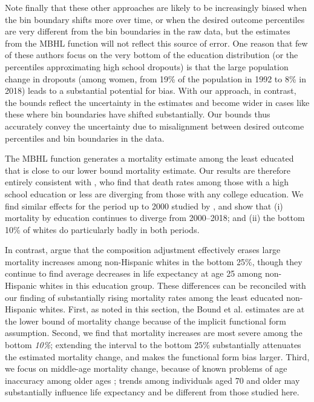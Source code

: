 Note finally that these other approaches are likely to be increasingly biased when the bin boundary shifts more over time, or when the desired outcome percentiles are very different from the bin boundaries in the raw data, but the estimates from the MBHL function will not reflect this source of error. One reason that few of these authors focus on the very bottom of the education distribution (or the percentiles approximating high school dropouts) is that the large population change in dropouts (among women, from 19\% of the population in 1992 to 8\% in 2018) leads to a substantial potential for bias.  With our approach, in contrast, the bounds reflect the uncertainty in the estimates and become wider in cases like these where bin boundaries have shifted substantially. Our bounds thus accurately convey the uncertainty due to misalignment between desired outcome percentiles and bin boundaries in the data.

The MBHL function generates a mortality estimate among the least educated that is close to our lower bound mortality estimate. Our results are therefore entirely consistent with \citet{Meara2008}, who find that death rates among those with a high school education or less are diverging from those with any college education. We find similar effects for the period up to 2000 studied by \citet{Meara2008}, and show that (i) mortality by education continues to diverge from 2000--2018; and (ii) the bottom 10\% of whites do particularly badly in both periods.

In contrast, \citet{Bound2015} argue that the composition adjustment effectively erases large mortality increases among non-Hispanic whites in the bottom 25\%, though they continue to find average decreases in life expectancy at age 25 among non-Hispanic whites in this education group.  These differences can be reconciled with our finding of substantially rising mortality rates among the least educated non-Hispanic whites. First, as noted in this section, the Bound et al. estimates are at the lower bound of mortality change because of the implicit functional form assumption. Second, we find that mortality increases are most severe among the bottom \textit{10\%}; extending the interval to the bottom 25\% substantially attenuates the estimated mortality change, and makes the functional form bias larger. Third, we focus on middle-age mortality change, because of known problems of age inaccuracy among older ages \citep{Olshansky2012}; trends among individuals aged 70 and older may substantially influence life expectancy and be different from those studied here.


